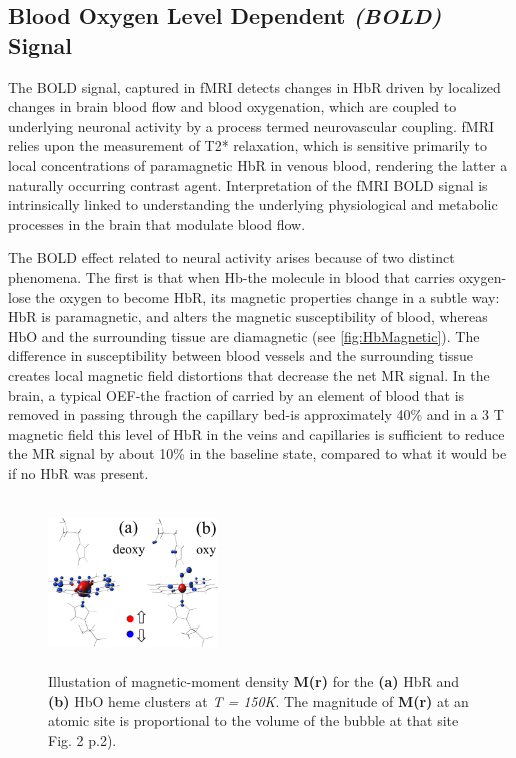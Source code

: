 \subsection{Blood Oxygen Level Dependent \textit{(BOLD)} Signal}

The \gls{BOLD} signal, captured in \gls{fMRI} detects changes in \gls{HbR} driven by localized changes in brain blood flow and blood oxygenation, which are coupled to underlying neuronal activity by a process termed neurovascular coupling. \gls{fMRI} relies upon the measurement of T2* relaxation, which is sensitive primarily to local concentrations of paramagnetic \gls{HbR} in venous blood, rendering the latter a naturally occurring contrast agent. Interpretation of the \gls{fMRI} \gls{BOLD} signal is intrinsically linked to understanding the underlying physiological and metabolic processes in the brain that modulate blood flow.

The \gls{BOLD} effect related to neural activity arises because of two distinct phenomena. The first is that when \gls{Hb}-the molecule in blood that carries oxygen-lose the oxygen to become \gls{HbR}, its magnetic properties change in a subtle way: \gls{HbR} is paramagnetic, and alters the magnetic susceptibility of blood, whereas \gls{HbO} and the surrounding tissue  are diamagnetic (see \autoref{fig:HbMagnetic}). The difference in susceptibility between blood vessels and the surrounding tissue creates local magnetic field distortions that decrease the net \gls{MR} signal. In the brain, a typical \gls{OEF}-the fraction of  carried by an element of blood that is removed in passing through the capillary bed-is approximately 40\% and in a 3 T magnetic field this level of \gls{HbR} in the veins and capillaries is sufficient to reduce the \gls{MR} signal by about 10\% in the baseline state, compared to what it would be if no \gls{HbR} was present. 

\begin{figure}
   \centering
   \includegraphics[width = 0.4\textwidth, height = 4.5cm]{assets/images/DeoxyHb_magnetic.jpg}
   \caption{Illustation of magnetic-moment density \textbf{M(r)} for the \textbf{(a)} \gls{HbR} and \textbf{(b)} \gls{HbO} heme clusters at \textit{T = 150K}. The magnitude of \textbf{M(r)} at an atomic site is proportional to the volume of the bubble at that site \cite{Mayda2020} Fig. 2 p.2).}
   \label{fig:HbMagnetic}
\end{figure}

